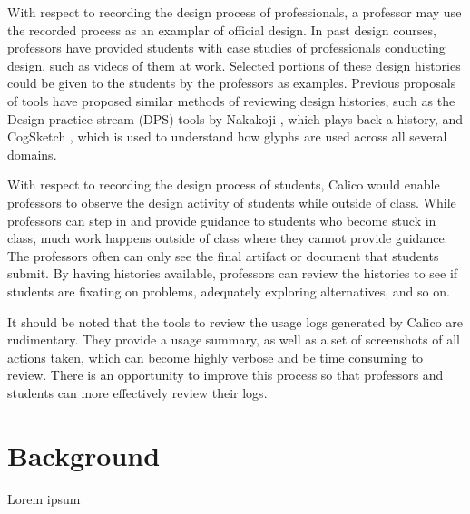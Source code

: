 \documentclass[12pt,fleqn]{ucithesis}
\begin{document}
With respect to recording the design process of professionals, a professor may use the recorded process as an examplar of official design. In past design courses, professors have provided students with case studies of professionals conducting design, such as videos of them at work. Selected portions of these design histories could be given to the students by the professors as examples. Previous proposals of tools have proposed similar methods of reviewing design histories, such as the Design practice stream (DPS) tools by Nakakoji \cite{Nakakoji6035659}, which plays back a history, and CogSketch \cite{Forbus1149}, which is used to understand how glyphs are used across all several domains.

With respect to recording the design process of students, Calico would enable professors to observe the design activity of students while outside of class. While professors can step in and provide guidance to students who become stuck in class, much work happens outside of class where they cannot provide guidance. The professors often can only see the final artifact or document that students submit. By having histories available, professors can review the histories to see if students are fixating on problems, adequately exploring alternatives, and so on.

It should be noted that the tools to review the usage logs generated by Calico are rudimentary. They provide a usage summary, as well as a set of screenshots of all actions taken, which can become highly verbose and be time consuming to review. There is an opportunity to improve this process so that professors and students can more effectively review their logs.

 \newpage 
\label{chapter:future-work}


\section{Background}

Lorem ipsum 

 \newpage 

\clearpage
{}
\end{document}

